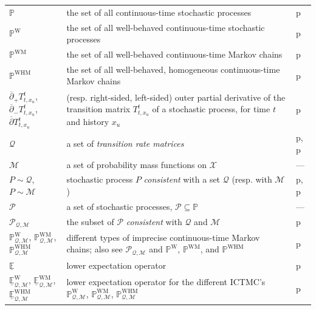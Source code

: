 \documentclass[10pt,a4paper]{paper}
\theoremstyle{definition}
\newcommand{\states}{\mathcal{X}}
\newcommand{\processes}{\mathbb{P}}
\newcommand{\wprocesses}{\processes^{\mathrm{W}}}
\newcommand{\wmprocesses}{\processes^{\mathrm{WM}}}
\newcommand{\whmprocesses}{\processes^{\mathrm{WHM}}}
\newcommand{\rateset}{\mathcal{Q}}
\newcommand{\placeref}[1]{p\pageref{#1}}
\begin{document}
\begin{table}[htb]
\begin{tabularx}{\textwidth}{l|X|l}
$\processes$ & the set of all continuous-time stochastic processes & \placeref{def:stoch_process} \\
$\wprocesses$ & the set of all well-behaved continuous-time stochastic processes & \placeref{def:well-behaved} \\
$\wmprocesses$ & the set of all well-behaved continuous-time Markov chains & \placeref{def:markov_property} \\
$\whmprocesses$ & the set of all well-behaved, homogeneous continuous-time Markov chains & \placeref{def:homogeneousMarkov} \\
$\overline{\partial}_+T_{t,x_u}^t$, $\overline{\partial}_-T_{t,x_u}^t$, $\overline{\partial}T_{t,x_u}^t$ & (resp. right-sided, left-sided) outer partial derivative of the transition matrix $T_{t,x_u}^t$ of a stochastic process, for time $t$ and history $x_u$ & \placeref{def:outerpartialderivatives} \\
$\rateset$ & a set of \emph{transition rate matrices} & \placeref{def:rate_matrix}, \placeref{notation:rate_set} \\
$\mathcal{M}$ & a set of probability mass functions on $\states$ & --- \\
$P\sim\rateset$, $P\sim\mathcal{M}$ & stochastic process $P$ \emph{consistent} with a set $\rateset$ (resp. with $\mathcal{M}$) & \placeref{def:consistent_process}, \placeref{def:consistent_process_initialdistribution} \\
$\mathcal{P}$ & a set of stochastic processes, $\mathcal{P}\subseteq\processes$ & --- \\
$\mathcal{P}_{\rateset,\mathcal{M}}$ & the subset of $\mathcal{P}$ \emph{consistent} with $\rateset$ and $\mathcal{M}$ & \placeref{def:consistent_process_set} \\
$\wprocesses_{\rateset,\mathcal{M}}$, $\wmprocesses_{\rateset,\mathcal{M}}$, $\whmprocesses_{\rateset,\mathcal{M}}$ & different types of imprecise continuous-time Markov chains; also see $\mathcal{P}_{\rateset,\mathcal{M}}$ and $\wprocesses$, $\wmprocesses$, and $\whmprocesses$ & \placeref{def:process_sets} \\
$\underline{\mathbb{E}}$ & lower expectation operator & \placeref{def:lower_exp} \\
$\underline{\mathbb{E}}^\mathrm{W}_{\rateset,\mathcal{M}}$, $\underline{\mathbb{E}}^\mathrm{WM}_{\rateset,\mathcal{M}}$, $\underline{\mathbb{E}}^\mathrm{WHM}_{\rateset,\mathcal{M}}$ & lower expectation operator for the different ICTMC's $\wprocesses_{\rateset,\mathcal{M}}$, $\wmprocesses_{\rateset,\mathcal{M}}$, $\whmprocesses_{\rateset,\mathcal{M}}$ & \placeref{def:lower_exp} \\

\end{tabularx}
\end{table}
\end{document}
